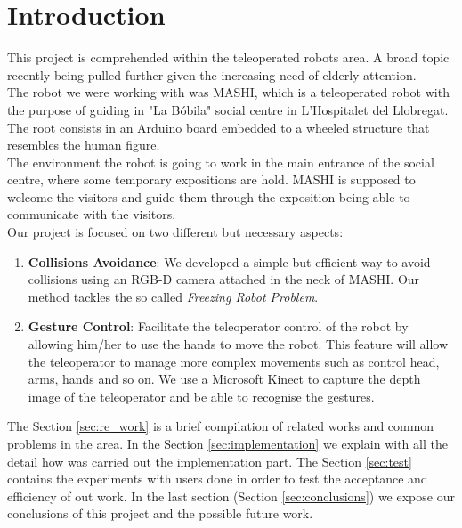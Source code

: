 \section{Introduction}
\label{sec:introduction}

This project is comprehended within the teleoperated robots area. A broad topic recently being pulled further given the increasing need of elderly attention.\\ 

The robot we were working with was MASHI, which is a teleoperated robot with the purpose of guiding in "La Bóbila" social centre in L'Hospitalet del Llobregat. The root consists in an Arduino board embedded to a wheeled structure that resembles the human figure.\\

The environment the robot is going to work in the main entrance of the social centre, where some temporary expositions are hold. MASHI is supposed to welcome the visitors and guide them through the exposition being able to communicate with the visitors.\\

Our project is focused on two different but necessary aspects:
\begin{enumerate}
	\item \textbf{Collisions Avoidance}: We developed a simple but efficient way to avoid collisions using an RGB-D camera attached in the neck of MASHI. Our method tackles the so called \emph{Freezing Robot Problem}.
	\item \textbf{Gesture Control}: Facilitate the teleoperator control of the robot by allowing him/her to use the hands to move the robot. This feature will allow the teleoperator to manage more complex movements such as control head, arms, hands and so on. We use a Microsoft Kinect to capture the depth image of the teleoperator and be able to recognise the gestures.
\end{enumerate}

The Section \ref{sec:re_work} is a brief compilation of related works and common problems in the area. In the Section \ref{sec:implementation} we explain with all the detail how was carried out the implementation part. The Section \ref{sec:test} contains the experiments with users done in order to test the acceptance and efficiency of out work. In the last section (Section \ref{sec:conclusions}) we expose our conclusions of this project and the possible future work.